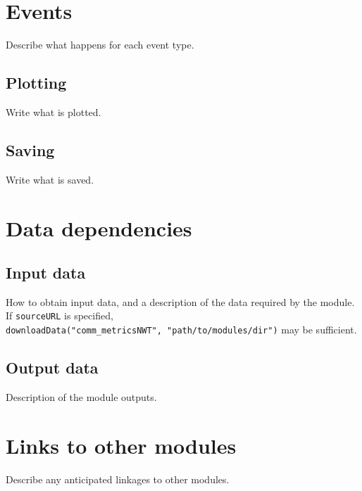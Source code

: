 \documentclass[]{article}
\begin{document}
\section{Events}\label{events}

Describe what happens for each event type.

\subsection{Plotting}\label{plotting}

Write what is plotted.

\subsection{Saving}\label{saving}

Write what is saved.

\section{Data dependencies}\label{data-dependencies}

\subsection{Input data}\label{input-data}

How to obtain input data, and a description of the data required by the
module. If \texttt{sourceURL} is specified,
\texttt{downloadData("comm\_metricsNWT",\ "path/to/modules/dir")} may be
sufficient.

\subsection{Output data}\label{output-data}

Description of the module outputs.

\section{Links to other modules}\label{links-to-other-modules}

Describe any anticipated linkages to other modules.
\end{document}
